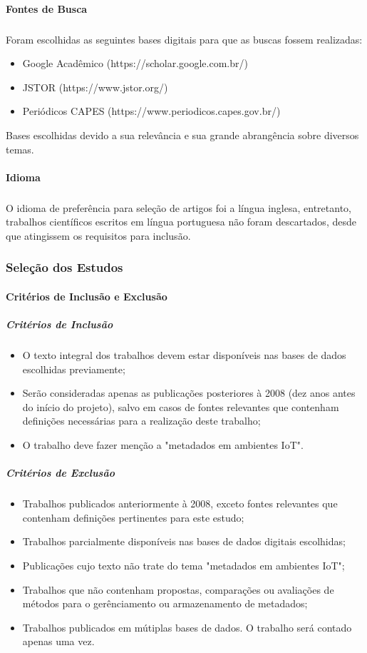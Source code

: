 \paragraph{Fontes de Busca}
\subparagraph{}
 Foram escolhidas as seguintes bases digitais para que as buscas fossem realizadas:
\begin{itemize}
  \item Google Acadêmico (https://scholar.google.com.br/)
  \item JSTOR (https://www.jstor.org/)
  \item Periódicos CAPES (https://www.periodicos.capes.gov.br/)
\end{itemize}
\quad Bases escolhidas devido a sua relevância e sua grande abrangência sobre diversos temas.

\paragraph{Idioma}
\subparagraph{}
\quad O idioma de preferência para seleção de artigos foi a língua inglesa, entretanto, trabalhos científicos escritos em
língua portuguesa não foram descartados, desde que atingissem os requisitos para inclusão.

\subsubsection{Seleção dos Estudos}
\paragraph{Critérios de Inclusão e Exclusão}
\subparagraph{Critérios de Inclusão}
\begin{itemize}
  \item O texto integral dos trabalhos devem estar disponíveis nas bases de dados escolhidas previamente;
  \item Serão consideradas apenas as publicações posteriores à 2008 (dez anos antes do início do projeto), salvo em casos de fontes relevantes que contenham definições necessárias para a realização deste trabalho;
  \item O trabalho deve fazer menção a "metadados em ambientes \acrlong{IoT}".
\end{itemize}

\subparagraph{Critérios de Exclusão}
\begin{itemize}
  \item Trabalhos publicados anteriormente à 2008, exceto fontes relevantes que contenham definições pertinentes para este estudo;
  \item Trabalhos parcialmente disponíveis nas bases de dados digitais escolhidas;
  \item Publicações cujo texto não trate do tema "metadados em ambientes \acrshort{IoT}";
  \item Trabalhos que não contenham propostas, comparações ou avaliações de métodos para o gerênciamento ou armazenamento de metadados;
  \item Trabalhos publicados em mútiplas bases de dados. O trabalho será contado apenas uma vez.
\end{itemize}

